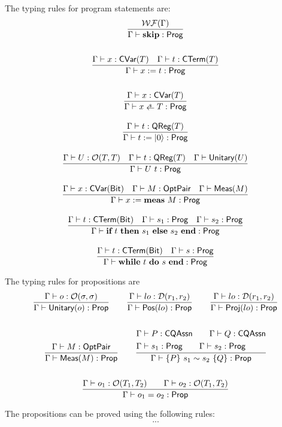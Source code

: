 The typing rules for program statements are:
\begin{gather*}
    \frac{\WF{\Gamma}}{\Gamma \vdash \Skip : \prog} \\
    \\
    \frac{\Gamma \vdash x : \cvar{T} \quad \Gamma \vdash t : \CTerm{T}}{\Gamma \vdash \Assign{x}{t} : \prog} \\
    \\
    \frac{\Gamma \vdash x : \cvar{T}}{\Gamma \vdash \pAssign{x}{T} : \prog} \\
    \\
    \frac{\Gamma \vdash t : \qreg{T}}{\Gamma \vdash \Init{t} : \prog} \\
    \\
    \frac{\Gamma \vdash U : \opt{T}{T} \quad \Gamma \vdash t : \qreg{T} \quad \Gamma \vdash \unitary{U}}{\Gamma \vdash U\ t : \prog} \\
    \\
    \frac{\Gamma \vdash x : \cvar{\bit} \quad \Gamma \vdash M : \optpair \quad \Gamma \vdash \meas{M}}{\Gamma \vdash \MeaAssign{x}{M} : \prog} \\
    \\
    \frac{\Gamma \vdash t : \CTerm{\bit} \quad \Gamma \vdash s_1 : \prog \quad \Gamma \vdash s_2 : \prog}
    {\Gamma \vdash \If{t}{s_1}{s_2} : \prog} \\
    \\
    \frac{\Gamma \vdash t : \CTerm{\bit} \quad \Gamma \vdash s : \prog}
    {\Gamma \vdash \While{t}{s} : \prog}
\end{gather*}



The typing rules for propositions are
\begin{gather*}
    \frac{\Gamma \vdash o : \mathcal{O}(\sigma, \sigma)}{\Gamma \vdash \textsf{Unitary}({o}) : \textsf{Prop}}
    \qquad
    \frac{\Gamma \vdash lo : \mathcal{D}(r_1, r_2)}{\Gamma \vdash \textsf{Pos}({lo}) : \textsf{Prop}} 
    \qquad
    \frac{\Gamma \vdash lo : \mathcal{D}(r_1, r_2)}{\Gamma \vdash \textsf{Proj}({lo}) : \textsf{Prop}} \\
    \\
    \frac{\Gamma \vdash M : \textsf{OptPair}}{\Gamma \vdash \textsf{Meas}(M) : \textsf{Prop}}
    \qquad
    \frac{
        \begin{aligned}
            & \Gamma \vdash P : \textsf{CQAssn} \qquad \Gamma \vdash Q : \textsf{CQAssn} \\
            & \Gamma \vdash s_1 : \textsf{Prog} \qquad \Gamma \vdash s_2 : \textsf{Prog}
        \end{aligned}}
        {
            \Gamma \vdash \{P\}~s_1 \sim s_2~\{Q\} : \textsf{Prop}
        } \\
    \\
    \frac{\Gamma \vdash o_1 : \mathcal{O}(T_1, T_2) \qquad \Gamma \vdash o_2 : \mathcal{O}(T_1, T_2)}{\Gamma \vdash o_1 = o_2 : \textsf{Prop}}
\end{gather*}


The propositions can be proved using the following rules:
\begin{gather*}
    ...
\end{gather*}